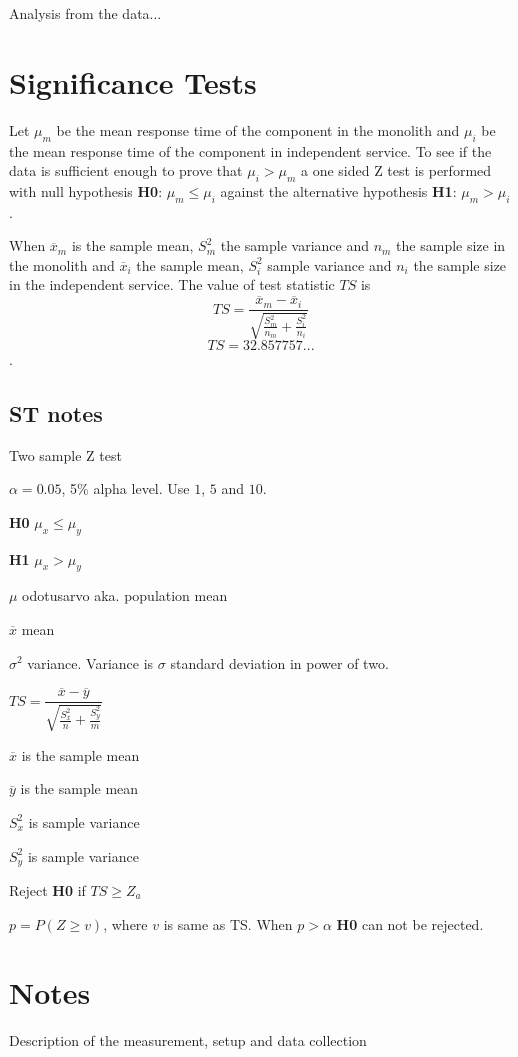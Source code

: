Analysis from the data...

\section{Significance Tests}
Let $\mu_m$ be the mean response time of the component in the monolith and $\mu_i$ be the mean response time of the component in independent service.
To see if the data is sufficient enough to prove that $\mu_i > \mu_m$ a one sided Z test is performed with null hypothesis \textbf{H0}: $\mu_m \leq \mu_i$ against the alternative hypothesis \textbf{H1}: $\mu_m > \mu_i$.

When $\overline{x}_m$ is the sample mean, $S_m^2$ the sample variance and $n_m$ the sample size in the monolith 
and $\overline{x}_i$ the sample mean, $S_i^2$ sample variance and $n_i$ the sample size in the independent service.
The value of test statistic $TS$ is
\[
TS=\frac{\overline{x}_m-\overline{x}_i}{\sqrt{\frac{S_m^2}{n_m}+\frac{S_i^2}{n_i}}}
\]
\[
TS=32.857757...
 \].


\subsection{ST notes}
Two sample Z test

$\alpha=0.05$, 5\% alpha level. Use $1$, $5$ and $10$.

\textbf{H0} $\mu_x \leq \mu_y$

\textbf{H1} $\mu_x > \mu_y$

$\mu$ odotusarvo aka. population mean

$\overline{x}$ mean

$\sigma^2$ variance. Variance is $\sigma$ standard deviation in power of two.

$TS=\dfrac{\overline{x}-\overline{y}}{\sqrt{\frac{S_x^2}{n}+\frac{S_y^2}{m}}}$

$\overline{x}$ is the sample mean

$\overline{y}$ is the sample mean

$S_x^2$ is sample variance

$S_y^2$ is sample variance

Reject \textbf{H0} if $TS\geq Z_{a}$

$p=P(Z \geq v)$, where $v$ is same as TS. When $p>\alpha$ \textbf{H0} can not be rejected.

\section{Notes}
Description of the measurement, setup and data collection


